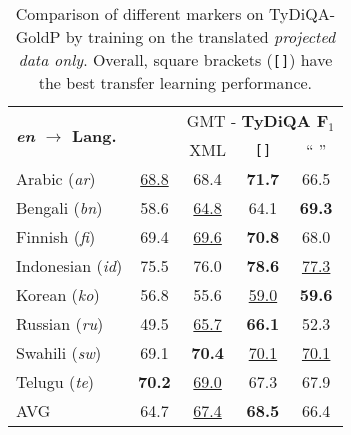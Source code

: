 \documentclass[11pt,dvipsnames]{article}
\begin{document}
\renewcommand{\arraystretch}{1.1}
\begin{table}[t!]
\centering
\small
\begin{tabular}{lcccc}
\toprule


\multirow{2}{*}{\textbf{\textit{en} $\rightarrow$ Lang.} }  & \multirow{2}{*}{\citeauthor{hu2020xtreme}} & \multicolumn{3}{c}{GMT - \textbf{TyDiQA F$_1$}}\\
\cmidrule{3-5}
&   & XML & \texttt{[]} & `` ''\\

\midrule
Arabic (\textit{ar}) & \underline{68.8}	& 68.4&	\textbf{71.7}&66.5\\
Bengali (\textit{bn}) &58.6	&\underline{64.8}	&64.1 & \textbf{69.3}\\
Finnish (\textit{fi}) &69.4	&\underline{69.6}	&\textbf{70.8}&68.0\\
Indonesian (\textit{id}) &75.5	&76.0	&\textbf{78.6}&\underline{77.3}\\
Korean (\textit{ko}) & 56.8	&55.6	&\underline{59.0}&\textbf{59.6}\\
Russian (\textit{ru}) &49.5	& \underline{65.7}	&\textbf{66.1}&52.3\\
Swahili (\textit{sw}) &69.1	&\textbf{70.4}	&\underline{70.1} & \underline{70.1} \\
Telugu (\textit{te}) & \textbf{70.2}	& \underline{69.0}	&67.3 & 67.9\\
\midrule
AVG & 64.7	&\underline{67.4}	&\textbf{68.5}& 66.4\\
\bottomrule
\end{tabular}
\vspace{-4pt}
\caption{Comparison of different markers on TyDiQA-GoldP by training on the translated \textit{projected data only}. Overall, square brackets (\texttt{[]}) have the best transfer learning performance.}\vspace{-17pt}
\label{table:quotes}
\end{table}
\end{document}

